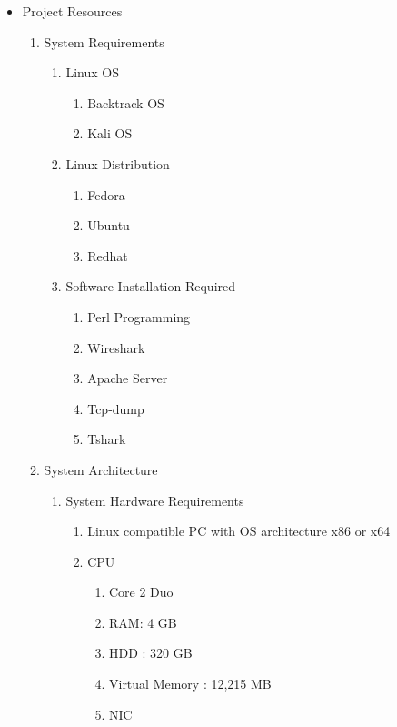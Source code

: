 \documentclass[12pt,a4paper]{report}
\begin{document}
\begin{itemize}
		\begin{itemize}
			\item Project Resources
				\begin{enumerate}
						\item System Requirements
						  \begin{enumerate}
							\item	Linux OS
								\begin{enumerate}
									\item	Backtrack OS
									\item	Kali OS
								\end{enumerate}
							\item	Linux Distribution 
								\begin{enumerate}
									\item	Fedora
									\item	Ubuntu
									\item	Redhat
								\end{enumerate}
							\item Software Installation Required
								\begin{enumerate}
									\item	Perl Programming
									\item	Wireshark
									\item	Apache Server
									\item	Tcp-dump
									\item	Tshark
								\end{enumerate}
						  \end{enumerate}
						\item System Architecture
							\begin{enumerate}
								\item System Hardware Requirements
									\begin{enumerate}
										\item Linux compatible PC with OS architecture x86 or x64
										\item CPU
											\begin{enumerate}
												\item	Core 2 Duo
												\item	RAM: 4 GB
												\item	HDD : 320 GB
												\item	Virtual Memory : 12,215 MB
												\item	NIC
											\end{enumerate}
									\end{enumerate}

\end{enumerate}
\end{enumerate}
\end{itemize}
\end{itemize}
\end{document}
